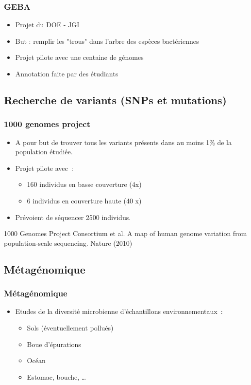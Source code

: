 \documentclass{beamer}
\begin{document}
\begin{frame}
	\frametitle{GEBA}
\begin{itemize}
\item Projet du DOE - JGI
\item But : remplir les "trous" dans l'arbre des espèces bactériennes
\item Projet pilote avec une centaine de génomes
\item Annotation faite par des étudiants
\end{itemize}
\end{frame}


\subsection{Recherche de variants (SNPs et mutations)} %
\label{sub:decouverte_de_variants}
\begin{frame}
	\frametitle{1000 genomes project}
\begin{itemize}
\item A pour but de trouver tous les variants présents dans au moins 1\% de la population étudiée.
\item Projet pilote avec~: 
\begin{itemize}
	\item 160 individus en basse couverture (4x) 
	\item 6 individus en couverture haute (40 x)
\end{itemize}
\item Prévoient de séquencer 2500 individus.
\end{itemize}
\tiny{1000 Genomes Project Consortium et al. A map of human genome variation from population-scale sequencing. Nature (2010)}
\end{frame}



\subsection{Métagénomique} %
\label{sub:métagénomique}

\begin{frame}
	\frametitle{Métagénomique}
\begin{itemize}
	\item Etudes de la diversité microbienne d'échantillons environnementaux~:
	\begin{itemize}
		\item Sols (éventuellement pollués)
		\item Boue d'épurations
		\item Océan
		\item Estomac, bouche, \ldots
	\end{itemize}
\end{itemize}
\end{frame}
\end{document}
